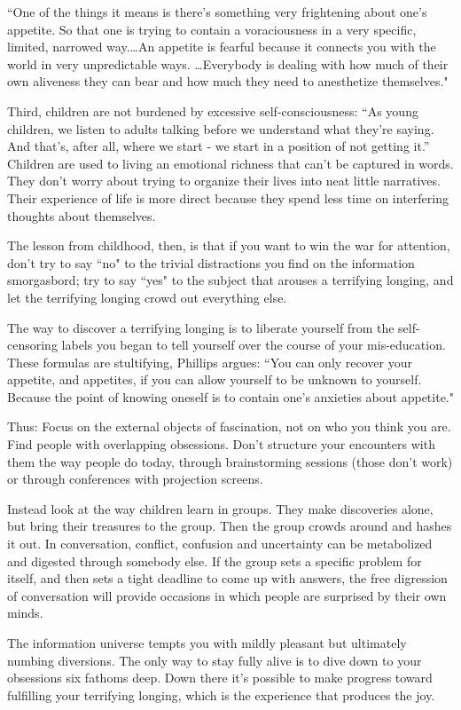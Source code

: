 \documentclass[12pt]{book}
\renewcommand{\indent}{\hspace{1cm}}
\begin{document}
\begin{linenumbers*}
\indent ``One of the things it means is there's something very frightening about one's appetite. So that one is trying to contain a voraciousness in a very specific, limited, narrowed way.\ldots An appetite is fearful because it connects you with the world in very unpredictable ways. \dots Everybody is dealing with how much of their own aliveness they can bear and how much they need to anesthetize themselves."

\indent Third, children are not burdened by excessive self-consciousness: ``As young children, we listen to adults talking before we understand what they're saying. And that's, after all, where we start - we start in a position of not getting it.” Children are used to living an emotional richness that can't be captured in words. They don't worry about trying to organize their lives into neat little narratives. Their experience of life is more direct because they spend less time on interfering thoughts about themselves.

\indent The lesson from childhood, then, is that if you want to win the war for attention, don't try to say ``no" to the trivial distractions you find on the information smorgasbord; try to say ``yes" to the subject that arouses a terrifying longing, and let the terrifying longing crowd out everything else.

The way to discover a terrifying longing is to liberate yourself from the self-censoring labels you began to tell yourself over the course of your mis-education. These formulas are stultifying, Phillips argues: ``You can only recover your appetite, and appetites, if you can allow yourself to be unknown to yourself. Because the point of knowing oneself is to contain one's anxieties about appetite."

\indent Thus: Focus on the external objects of fascination, not on who you think you are. Find people with overlapping obsessions. Don't structure your encounters with them the way people do today, through brainstorming sessions (those don't work) or through conferences with projection screens.

\indent Instead look at the way children learn in groups. They make discoveries alone, but bring their treasures to the group. Then the group crowds around and hashes it out. In conversation, conflict, confusion and uncertainty can be metabolized and digested through somebody else. If the group sets a specific problem for itself, and then sets a tight deadline to come up with answers, the free digression of conversation will provide occasions in which people are surprised by their own minds.

\indent The information universe tempts you with mildly pleasant but ultimately numbing diversions. The only way to stay fully alive is to dive down to your obsessions six fathoms deep. Down there it's possible to make progress toward fulfilling your terrifying longing, which is the experience that produces the joy.
\end{linenumbers*}
\end{document}
